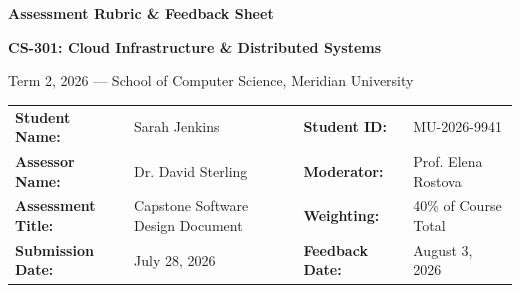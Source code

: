 \begin{center}
  \vspace*{0.5em}
  {\color{primary}\Huge\bfseries Assessment Rubric \& Feedback Sheet}
  \par\vspace{0.4em}
  {\color{secondary}\large\bfseries CS-301: Cloud Infrastructure \& Distributed Systems}
  \par\vspace{0.2em}
  {\color{textmute}\small Term 2, 2026 --- School of Computer Science, Meridian University}
\end{center}

\vspace{1.5em}

\begin{tcolorbox}[colframe=bordercolor, colback=lightbg, arc=4pt, title={ASSESSMENT METADATA}]
\small
\renewcommand{\arraystretch}{1.3}
\begin{tabularx}{\textwidth}{@{}l X l X@{}}
  \textbf{Student Name:} & Sarah Jenkins & \textbf{Student ID:} & MU-2026-9941 \\
  \textbf{Assessor Name:} & Dr. David Sterling & \textbf{Moderator:} & Prof. Elena Rostova \\
  \textbf{Assessment Title:} & Capstone Software Design Document & \textbf{Weighting:} & 40\% of Course Total \\
  \textbf{Submission Date:} & July 28, 2026 & \textbf{Feedback Date:} & August 3, 2026 \\
\end{tabularx}
\end{tcolorbox}

\vspace{1em}

